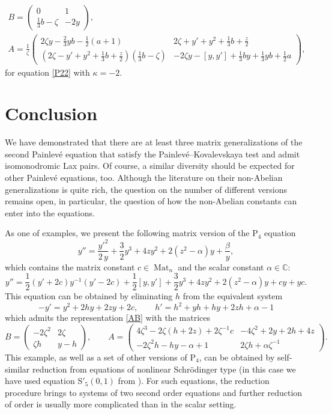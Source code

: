 \documentclass{article}
\theoremstyle{plain}
\theoremstyle{definition}
\DeclareMathOperator{\Mat}{Mat}
\begin{document}
\begin{gather*}
 B=\begin{pmatrix}
  0 & 1\\
  \frac{1}{3}b-\zeta & -2y
 \end{pmatrix},\\[1.5mm]
 A= \frac{1}{\zeta}\begin{pmatrix}
  2\zeta y-\frac{2}{3}yb-\frac{1}{2}(a+1) & 2\zeta+y'+y^2+\frac{1}{3}b+\frac{z}{2}\\[1mm]
  (2\zeta-y'+y^2+\frac{1}{3}b+\frac{z}{2})(\frac{1}{3}b-\zeta) & 
  -2\zeta y -[y,y']+\frac{1}{3}by+\frac{1}{3}yb+\frac{1}{2}a
 \end{pmatrix},
\end{gather*}
for equation \ref{P22} with $\kappa=-2$.

\section{Conclusion}

We have demonstrated that there are at least three matrix generalizations of the second Painlev\'e equation that satisfy the Painlev\'e--Kovalevskaya test and admit isomonodromic Lax pairs. Of course, a similar diversity should be expected for other Painlev\'e equations, too. Although the literature on their non-Abelian generalizations is quite rich, the question on the number of different versions remains open, in particular, the question of how the non-Abelian constants can enter into the equations.

As one of examples, we present the following matrix version of the P$_4$ equation
\[
 y''= \frac{y'^2}{2\, y}  +\frac{3}{2}y^3+4zy^2 +2(z^2-\alpha)y+\frac{\beta}{y}, 
\]
which contains the matrix constant $c\in\Mat_n$ and the scalar constant $\alpha\in{\mathbb C}$:
\[
 y''= \frac{1}{2}(y'+2c)y^{-1}(y'-2c) +\frac{1}{2}[y,y'] +\frac{3}{2}y^3+4zy^2 +2(z^2-\alpha)y+cy+yc.
\]
This equation can be obtained by eliminating $h$ from the equivalent system
\[
 -y'=y^2+2hy+2zy+2c,\qquad h'=h^2+yh+hy+2zh+\alpha-1
\]
which admits the representation \eqref{AB} with the matrices
\[
 B=\begin{pmatrix}
  -2\zeta^2 & 2\zeta \\
  \zeta h & y-h
 \end{pmatrix},\qquad
 A=\begin{pmatrix}
  4\zeta^3-2\zeta(h+2z)+2\zeta^{-1}c & -4\zeta^2+2y+2h+4z \\
  -2\zeta^2h-hy-\alpha+1 & 2\zeta h+\alpha\zeta^{-1}
 \end{pmatrix}.
\]
This example, as well as a set of other versions of P$_4$, can be obtained by self-similar reduction from equations of nonlinear Schr\"odinger type (in this case we have used equation S$'_5(0,1)$ from \cite{Adler_Sokolov_2020}). For such equations, the reduction procedure brings to systems of two second order equations and  further reduction of order is usually more complicated than in the scalar setting.
\end{document}
